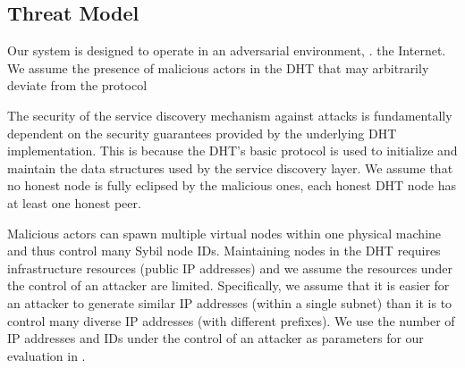 \subsection{Threat Model}
Our system is designed to operate in an adversarial environment, \ie. the Internet. We assume the presence of malicious actors in the DHT that may arbitrarily deviate from the protocol%

The security of the service discovery mechanism against attacks is fundamentally dependent on the security guarantees provided by the underlying DHT implementation. This is because the DHT's basic protocol is used to initialize and maintain the data structures used by the service discovery layer. We assume that no honest node is fully eclipsed by the malicious ones, \ie each honest DHT node has at least one honest peer. 

Malicious actors can spawn multiple virtual nodes within one physical machine and thus control many Sybil node IDs. Maintaining nodes in the DHT requires infrastructure resources (public IP addresses) and we assume the resources under the control of an attacker are limited. Specifically, we assume that it is easier for an attacker to generate similar IP addresses (\ie within a single subnet) than it is to control many diverse IP addresses (with different prefixes). We use the number of IP addresses and IDs under the control of an attacker as parameters for our evaluation in .

